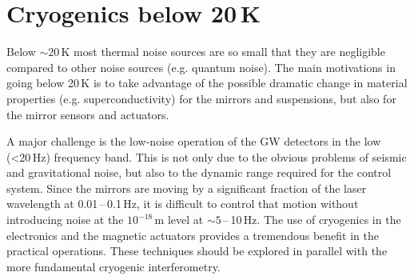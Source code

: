 
\section{Cryogenics below 20\,K}
\label{sec:cryo20}
Below $\sim20$\,K most thermal noise sources are so small that they are negligible compared to other noise sources (e.g. quantum noise).
The main motivations in going below 20\,K is to take advantage of the possible dramatic change in material properties (e.g. superconductivity) for the mirrors and suspensions, but also for the mirror sensors and actuators.

A major challenge is the low-noise operation of the GW detectors in the low (<20\,Hz) frequency band. This is not only due to the obvious problems of seismic and gravitational noise, but also to the dynamic range required for the control system.
Since the mirrors are moving by a significant fraction of the laser wavelength at 0.01\,--\,0.1\,Hz, it is difficult to control that motion without introducing noise at the $10^{-18}$\,m level at $\sim5$\,--\,10\,Hz. The use of cryogenics in the electronics and the magnetic actuators\cite{cryo:OSEM} provides a tremendous benefit in the practical operations. These techniques should be explored in parallel with the more fundamental cryogenic interferometry.



